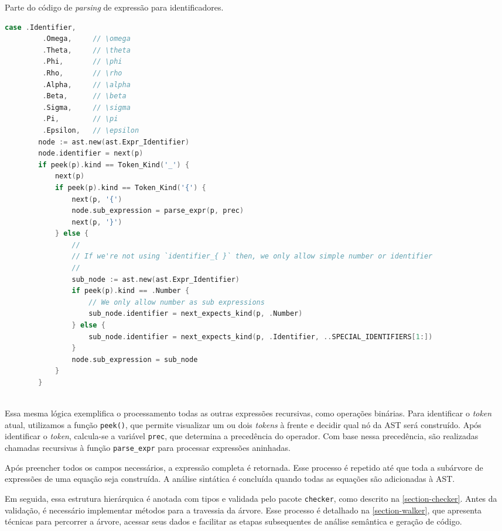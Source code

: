 \begin{codigo}[htb]
    \caption{\small Parte do código de \textit{parsing} de expressão para identificadores. }
        \label{cod-expression-ident-recursive}
  \begin{lstlisting}[language = C]
    case .Identifier,
         .Omega,     // \omega
         .Theta,     // \theta
         .Phi,       // \phi
         .Rho,       // \rho
         .Alpha,     // \alpha
         .Beta,      // \beta
         .Sigma,     // \sigma
         .Pi,        // \pi
         .Epsilon,   // \epsilon
        node := ast.new(ast.Expr_Identifier)
        node.identifier = next(p)
        if peek(p).kind == Token_Kind('_') {
            next(p)
            if peek(p).kind == Token_Kind('{') {
                next(p, '{')
                node.sub_expression = parse_expr(p, prec)
                next(p, '}')
            } else {
                //
                // If we're not using `identifier_{ }` then, we only allow simple number or identifier
                //
                sub_node := ast.new(ast.Expr_Identifier)
                if peek(p).kind == .Number {
                    // We only allow number as sub expressions
                    sub_node.identifier = next_expects_kind(p, .Number)
                } else {
                    sub_node.identifier = next_expects_kind(p, .Identifier, ..SPECIAL_IDENTIFIERS[1:])
                }
                node.sub_expression = sub_node
            }
        }
    
  \end{lstlisting}
\end{codigo}

Essa mesma lógica exemplifica o processamento todas as outras expressões recursivas, como operações binárias. Para identificar o \textit{token} atual, utilizamos a função \texttt{peek()}, que permite visualizar um ou dois \textit{tokens} à frente e decidir qual nó da AST será construído. Após identificar o \textit{token}, calcula-se a variável \texttt{prec}, que determina a precedência do operador. Com base nessa precedência, são realizadas chamadas recursivas à função \texttt{parse\_expr} para processar expressões aninhadas.

Após preencher todos os campos necessários, a expressão completa é retornada. Esse processo é repetido até que toda a subárvore de expressões de uma equação seja construída. A análise sintática é concluída quando todas as equações são adicionadas à AST.

Em seguida, essa estrutura hierárquica é anotada com tipos e validada pelo pacote \texttt{checker}, como descrito na \autoref{section-checker}. Antes da validação, é necessário implementar métodos para a travessia da árvore. Esse processo é detalhado na \autoref{section-walker}, que apresenta técnicas para percorrer a árvore, acessar seus dados e facilitar as etapas subsequentes de análise semântica e geração de código.
